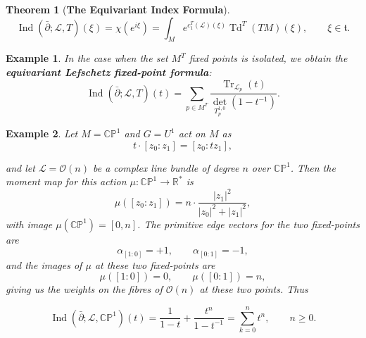 \documentclass{article}
\newtheorem{theorem}{Theorem}[section]
\newtheorem{example}{Example}
\newcommand{\ra}{\rightarrow}
\newcommand{\PP}{\mathbb{P}}
\newcommand{\RR}{\mathbb{R}}
\newcommand{\CC}{\mathbb{C}}
\newcommand{\mcL}{\mathcal{L}}
\newcommand{\mcO}{\mathcal{O}}
\newcommand{\mft}{\mathfrak{t}}
\newcommand{\mc}[1]{\mathcal{#1}}
\DeclareMathOperator{\Tr}{Tr}
\DeclareMathOperator{\Td}{Td}
\DeclareMathOperator{\Ind}{Ind}
\begin{document}
\begin{theorem}[\textbf{The Equivariant Index Formula}]
	\begin{equation*}
		\Ind(\bar{\partial}; \mcL, T)(\xi) = \chi(e^{i\xi}) = \int_{M} e^{c_{1}^{T}(\mcL)(\xi)} \Td^{T}(TM)(\xi), \qquad \xi \in \mft.
	\end{equation*}
\end{theorem}

\begin{example}
	In the case when the set $M^{T}$ fixed points is isolated, we obtain the \textbf{equivariant Lefschetz fixed-point formula}:
	\begin{equation*}
		\Ind(\bar{\partial}; \mcL,T)(t) = \sum\limits_{p \in M^{T}} \frac{\Tr_{\mcL_{p}}(t)}{\det_{T_{p}^{1,0}}(1 - t^{-1})}.
	\end{equation*}
\end{example}

\begin{example}
	Let $M = \CC\PP^{1}$ and $G = U^{1}$ act on $M$ as
	\begin{equation*}
		t \cdot [z_{0}: z_{1}] = [z_{0} : tz_{1}],
	\end{equation*}

	and let $\mcL = \mcO(n)$ be a complex line bundle of degree $n$ over $\CC\PP^{1}$. Then the moment map for this action $\mu : \CC\PP^{1} \ra \RR^{\ast}$ is
	\begin{equation*}
		\mu([z_{0}:z_{1}]) = n\cdot\frac{|z_{1}|^{2}}{|z_{0}|^{2} + |z_{1}|^{2}},
	\end{equation*}
	with image $\mu(\CC\PP^{1}) = [0, n]$. The primitive edge vectors for the two fixed-points are
	\begin{equation*}
		\alpha_{[1:0]} = +1, \qquad \alpha_{[0:1]} = -1,
	\end{equation*}
	and the images of $\mu$ at these two fixed-points are
	\begin{equation*}
		 \mu([1:0]) = 0, \qquad \mu([0:1]) = n,
	\end{equation*}
	giving us the weights on the fibres of $\mc{O}(n)$ at these two points. Thus
	
	\begin{equation*}
		\Ind(\bar{\partial}; \mcL, \CC\PP^{1})(t) = \frac{1}{1 - t} + \frac{t^{n}}{1 - t^{-1}} = \sum_{k = 0}^{n}t^{n}, \qquad n \geq 0.
	\end{equation*}

\end{example}
\end{document}

